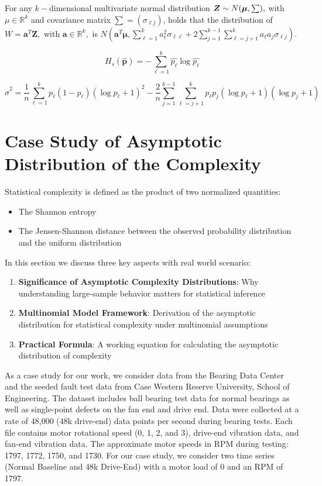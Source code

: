 For any $k-$dimensional multivariate normal distribution $\bm{Z}\sim \normalsize N(\bm{\mu},\sum),$ with $\mu \in \mathbb{R}^k$ and covariance matrix $\sum=(\sigma_{{\ell}{j}})$, holds that the distribution of $W=\bm{a}^T\bm{Z},$ with $\bm{a} \in \mathbb{R}^k,$ is $N(\bm{a}^T\bm{\mu},\sum_{\ell=1}^{k}a_\ell^2 \sigma_{{\ell}{\ell}}+2\sum_{j=1}^{k-1}\sum_{\ell=j+1}^{k} a_\ell a_j\sigma_{{\ell}{j}})$. 

\begin{equation}
	H_s(\widehat{\bm{p}})=-\sum_{\ell=1}^{k}\widehat{p_\ell}\log\widehat{p_\ell}
\end{equation}

\begin{equation}
	\widehat{\sigma}^2=\dfrac{1}{n}\sum_{\ell=1}^{k}p_\ell(1-p_\ell)(\log p_\ell+1)^2-\dfrac{2}{n}\sum_{j=1}^{k-1}\sum_{\ell=j+1}^{k}p_\ell p_j(\log p_\ell+1)(\log p_j+1)
\end{equation}
	   
\section{Case Study of Asymptotic Distribution of the Complexity} 

Statistical complexity is defined as the product of two normalized quantities:
\begin{itemize}
	\item The Shannon entropy
	\item The Jensen-Shannon distance between the observed probability distribution and the uniform distribution 
\end{itemize}

In this section we discuss three key aspects with real world scenario:
\begin{enumerate}
	\item \textbf{Significance of Asymptotic Complexity Distributions}: Why understanding large-sample behavior matters for statistical inference
	\item \textbf{Multinomial Model Framework}: Derivation of the asymptotic distribution for statistical complexity under multinomial assumptions
	\item \textbf{Practical Formula}: A working equation for calculating the asymptotic distribution of complexity
\end{enumerate}

As a case study for our work, we consider data from the Bearing Data Center and the seeded fault test data from Case Western Reserve University, School of Engineering. The dataset includes ball bearing test data for normal bearings as well as single-point defects on the fan end and drive end. Data were collected at a rate of 48,000 (48k drive-end) data points per second during bearing tests. Each file contains motor rotational speed (0, 1, 2, and 3), drive-end vibration data, and fan-end vibration data. The approximate motor speeds in RPM during testing: 1797, 1772, 1750, and 1730. For our case study, we consider two time series (Normal Baseline and 48k Drive-End) with a motor load of 0 and an RPM of 1797. 

